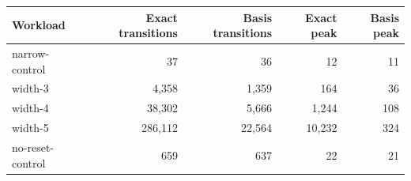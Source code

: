\begin{tabular}{lrrrr}
\toprule
Workload & Exact transitions & Basis transitions & Exact peak & Basis peak\\
\midrule
narrow-control & 37 & 36 & 12 & 11\\
width-3 & 4,358 & 1,359 & 164 & 36\\
width-4 & 38,302 & 5,666 & 1,244 & 108\\
width-5 & 286,112 & 22,564 & 10,232 & 324\\
no-reset-control & 659 & 637 & 22 & 21\\
\bottomrule
\end{tabular}
